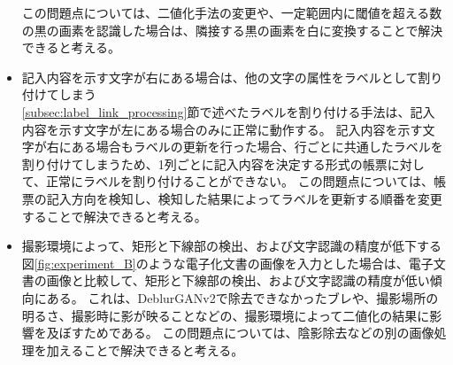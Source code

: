 \begin{itemize}
        この問題点については、二値化手法の変更や、一定範囲内に閾値を超える数の黒の画素を認識した場合は、隣接する黒の画素を白に変換することで解決できると考える。
    \item 記入内容を示す文字が右にある場合は、他の文字の属性をラベルとして割り付けてしまう\\
        \ref{subsec:label_link_processing}節で述べたラベルを割り付ける手法は、記入内容を示す文字が左にある場合のみに正常に動作する。
        記入内容を示す文字が右にある場合もラベルの更新を行った場合、行ごとに共通したラベルを割り付けてしまうため、1列ごとに記入内容を決定する形式の帳票に対して、正常にラベルを割り付けることができない。
        この問題点については、帳票の記入方向を検知し、検知した結果によってラベルを更新する順番を変更することで解決できると考える。
    \item 撮影環境によって、矩形と下線部の検出、および文字認識の精度が低下する\\
        図\ref{fig:experiment_B}のような電子化文書の画像を入力とした場合は、電子文書の画像と比較して、矩形と下線部の検出、および文字認識の精度が低い傾向にある。
        これは、DeblurGANv2で除去できなかったブレや、撮影場所の明るさ、撮影時に影が映ることなどの、撮影環境によって二値化の結果に影響を及ぼすためである。
        この問題点については、陰影除去などの別の画像処理を加えることで解決できると考える。
\end{itemize}